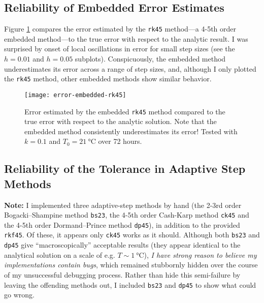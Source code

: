 \documentclass[11pt, a4paper]{article}
\begin{document}
\subsection{Reliability of Embedded Error Estimates}
Figure \ref{ivp:fig:error-embedded-rk45} compares the error estimated by the \texttt{rk45} method---a 4-5th order embedded method---to the true error with respect to the analytic result. I was surprised by onset of local oscillations in error for small step sizes (see the $ h = 0.01 $ and $ h = 0.05 $ subplots). Conspicuously, the embedded method underestimates its error across a range of step sizes, and, although I only plotted the \texttt{rk45}  method, other embedded methods show similar behavior. 

\begin{figure}
\centering
\texttt{[image: error-embedded-rk45]}

\caption{Error estimated by the embedded \texttt{rk45} method compared to the true error with respect to the analytic solution. Note that the embedded method consistently underestimates its error! Tested with $ k = 0.1 $ and $ T_{0} = \SI{21}{\degreeCelsius} $ over 72 hours.} 

\label{ivp:fig:error-embedded-rk45}

\end{figure} 

\subsection{Reliability of the Tolerance in Adaptive Step Methods} \label{ivp:ss:adaptive}
\textbf{Note:} I implemented three adaptive-step methods by hand (the 2-3rd order Bogacki–Shampine method \texttt{bs23}, the 4-5th order Cash-Karp method \texttt{ck45} and the 4-5th order Dormand–Prince method \texttt{dp45}), in addition to the provided \texttt{rkf45}. Of these, it appears only \texttt{ck45} works as it should. Although both \texttt{bs23} and \texttt{dp45} give ``macroscopically'' acceptable results (they appear identical to the analytical solution on a scale of e.g. $ T \sim \SI{1}{\degreeCelsius} $), \textit{I have strong reason to believe my implementations contain bugs}, which remained stubbornly hidden over the course of my unsuccessful debugging process. Rather than hide this semi-failure by leaving the offending methods out, I included \texttt{bs23} and \texttt{dp45} to show what could go wrong.
\end{document}
